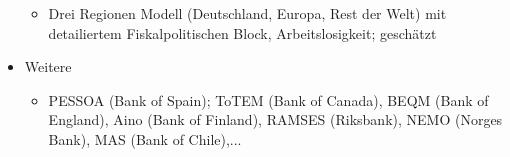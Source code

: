 \documentclass[10pt]{beamer}  %
\begin{document}
\begin{frame}
\begin{itemize}
\begin{itemize}\tiny
\item Drei Regionen Modell (Deutschland, Europa, Rest der Welt) mit detailiertem Fiskalpolitischen Block, Arbeitslosigkeit; gesch\"{a}tzt
\end{itemize}
\item Weitere
\begin{itemize}\tiny
\item PESSOA (Bank of Spain); ToTEM (Bank of Canada), BEQM (Bank of England), Aino (Bank of Finland), RAMSES (Riksbank), NEMO (Norges Bank), MAS (Bank of Chile),...
\end{itemize}
\end{itemize}
\end{frame}
\end{document}
